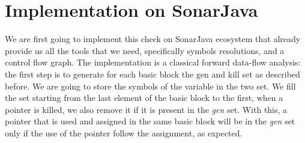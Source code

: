 \section{Implementation on SonarJava}
\label{sec:implementation_java}

We are first going to implement this check on SonarJava ecosystem that already provide us all the tools that we need, specifically symbols resolutions, and a control flow graph.
The implementation is a classical forward data-flow analysis: the first step is to generate for each basic block the gen and kill set as described before. 
We are going to store the symbols of the variable in the two set. 
We fill the set starting from the last element of the basic block to the first, when a pointer is killed, we also remove it if it is present in the \emph{gen} set.
With this, a pointer that is used and assigned in the same basic block will be in the \emph{gen} set only if the use of the pointer follow the assignment, as expected.

 

